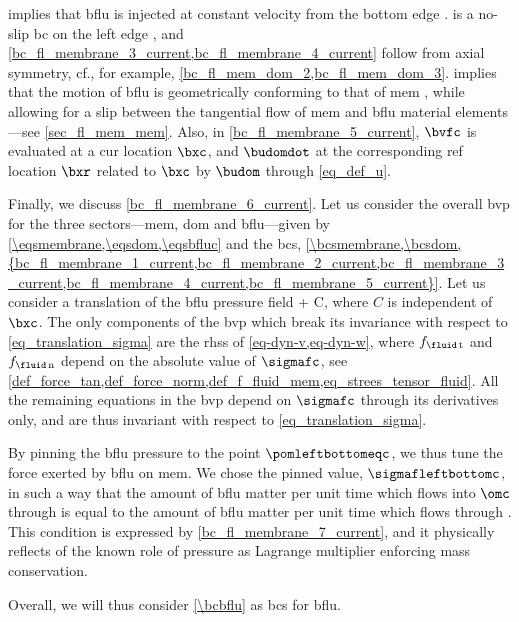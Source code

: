  implies that \ac{bflu} is injected at constant velocity from the bottom edge \pombottomc.   is a no-slip \ac{bc} on the left edge \pominc, and \cref{bc_fl_membrane_3_current,bc_fl_membrane_4_current} follow from axial symmetry, cf., for example, \cref{bc_fl_mem_dom_2,bc_fl_mem_dom_3}.
 implies that the motion of \ac{bflu} is geometrically conforming to that of \ac{mem}   \cite{kamenskyLectureNotesMAE}, while allowing for a slip between the tangential flow of \ac{mem} and \ac{bflu} material elements---see \cref{sec_fl_mem_mem}. Also, in \cref{bc_fl_membrane_5_current}, $\bvfc$ is evaluated at a \ac{cur} location $\bxc$, and $\budomdot$ at the corresponding \ac{ref} location $\bxr$ related to $\bxc$ by $\budom$ through \cref{eq_def_u}.
%

Finally, we discuss \cref{bc_fl_membrane_6_current}. Let us consider the overall \ac{bvp} for the three sectors---\ac{mem}, \ac{dom} and \ac{bflu}---given by \cref{\eqsmembrane,\eqsdom,\eqsbfluc} and the \acp{bc}, \cref{\bcsmembrane,\bcsdom,{bc_fl_membrane_1_current,bc_fl_membrane_2_current,bc_fl_membrane_3_current,bc_fl_membrane_4_current,bc_fl_membrane_5_current}}. Let us consider a translation of the \ac{bflu} pressure field
\be \label{eq_translation_sigma}
\sigmafc \rightarrow \sigmafc + C,
\ee
where $C$ is independent of $\bxc$. The only components of the \ac{bvp} which break its invariance with respect to \cref{eq_translation_sigma} are the \acp{rhs} of \cref{eq-dyn-v,eq-dyn-w}, where $f_{\fluid\, \text{t}}$ and $f_{\fluid\, \text{n}}$ depend on the absolute value of $\sigmafc$, see \cref{def_force_tan,def_force_norm,def_f_fluid_mem,eq_strees_tensor_fluid}. All the remaining equations in the \ac{bvp} depend on $\sigmafc$ through its derivatives only, and are thus invariant with respect to  \cref{eq_translation_sigma}.

By pinning the \ac{bflu} pressure to the point $\pomleftbottomeqc$, we  thus tune the force exerted by \ac{bflu} on \ac{mem}. We chose the pinned value, $\sigmafleftbottomc$, in such a way that the amount of \ac{bflu} matter  per unit time which flows into $\omc$ through \pombottomc{} is equal to the amount of \ac{bflu} matter per unit time which flows through \pomtopc. This condition is expressed by \cref{bc_fl_membrane_7_current}, and it physically reflects of the known role of pressure as Lagrange multiplier enforcing mass conservation.

Overall, we will thus consider \cref{\bcbflu} as \acp{bc} for \ac{bflu}.

